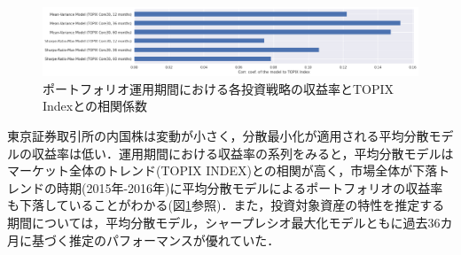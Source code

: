 \documentclass[dvipdfmx,autodetect-engine]{jsarticle}
\begin{document}
\begin{figure}[hb]
    \begin{center}
        \includegraphics[width=0.75\hsize]{./figures/vs_tpx_corrcoef.png}
        \caption{ポートフォリオ運用期間における各投資戦略の収益率とTOPIX Indexとの相関係数}
        \label{fig:corrcoef_tpx}
    \end{center}
\end{figure}

\newpage

東京証券取引所の内国株は変動が小さく，分散最小化が適用される平均分散モデルの収益率は低い．運用期間における収益率の系列をみると，平均分散モデルはマーケット全体のトレンド(TOPIX INDEX)との相関が高く，市場全体が下落トレンドの時期(2015年-2016年)に平均分散モデルによるポートフォリオの収益率も下落していることがわかる(図\ref{fig:corrcoef_tpx}参照)．また，投資対象資産の特性を推定する期間については，平均分散モデル，シャープレシオ最大化モデルともに過去36カ月に基づく推定のパフォーマンスが優れていた．
\end{document}
